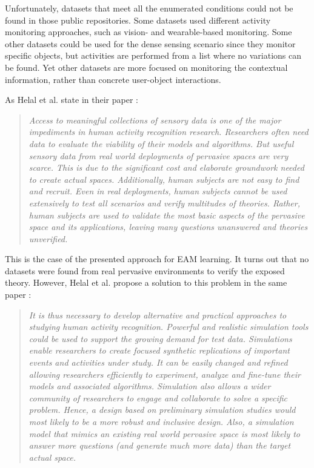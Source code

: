 Unfortunately, datasets that meet all the enumerated conditions could not be found in those public repositories. Some datasets used different activity monitoring approaches, such as vision- and wearable-based monitoring. Some other datasets could be used for the dense sensing scenario since they monitor specific objects, but activities are performed from a list where no variations can be found. Yet other datasets are more focused on monitoring the contextual information, rather than concrete user-object interactions.

As Helal et al. state in their paper \cite{Helal2011}:

\blockquote{\textit{Access to meaningful collections of sensory data is one of the major impediments in human activity recognition research. Researchers often need data to evaluate the viability of their models and algorithms. But useful sensory data from real world deployments of pervasive spaces are very scarce. This is due to the significant cost and elaborate groundwork needed to create actual spaces. Additionally, human subjects are not easy to find and recruit. Even in real deployments, human subjects cannot be used extensively to test all scenarios and verify multitudes of theories. Rather, human subjects are used to validate the most basic aspects of the pervasive space and its applications, leaving many questions unanswered and theories unverified.}}

This is the case of the presented approach for EAM learning. It turns out that no datasets were found from real pervasive environments to verify the exposed theory. However, Helal et al. propose a solution to this problem in the same paper \cite{Helal2011}:

\blockquote{\textit{It is thus necessary to develop alternative and practical approaches to studying human activity recognition. Powerful and realistic simulation tools could be used to support the growing demand for test data. Simulations enable researchers to create focused synthetic replications of important events and activities under study. It can be easily changed and refined allowing researchers efficiently to experiment, analyze and fine-tune their models and associated algorithms. Simulation also allows a wider community of researchers to engage and collaborate to solve a specific problem. Hence, a design based on preliminary simulation studies would most likely to be a more robust and inclusive design. Also, a simulation model that mimics an existing real world pervasive space is most likely to answer more questions (and generate much more data) than the target actual space.}}

